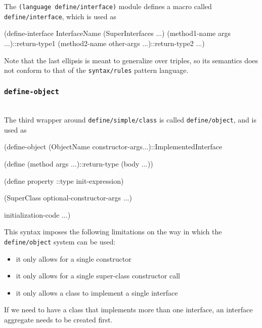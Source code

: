 \documentclass[acmsmall]{acmart}
\newenvironment{Snippet}{\Verbatim[samepage=true]}{\endVerbatim}
\begin{document}
The \texttt{(language define\-/interface)} module defines a macro called
\texttt{define\-/interface}, which is used as

\begin{Snippet}
  (define-interface InterfaceName (SuperInterfaces ...)
    (method1-name args ...)::return-type1
    (method2-name other-args ...)::return-type2
    ...)
\end{Snippet}

Note that the last ellipsis is meant to generalize over triples, so
its semantics does not conform to that of the \texttt{syntax\-/rules}
pattern language.

\subsubsection*{\texttt{\textbf{define-object}}} \ \\

The third wrapper around \texttt{define\-/simple\-/class} is called
\texttt{define\-/object}, and is used as

\begin{Snippet}
  (define-object (ObjectName constructor-args...)::ImplementedInterface
  
    (define (method args ...)::return-type (body ...))
  
    (define property ::type init-expression)
  
    (SuperClass optional-constructor-args ...)

    initialization-code ...)
\end{Snippet}

This syntax imposes the following limitations on the way in which
the \texttt{define\-/object} system can be used:
\begin{itemize}
\item it only allows for a single constructor
\item it only allows for a single super-class constructor call
\item it only allows a class to implement a single interface
\end{itemize}

If we need to have a class that implements more than one interface,
an interface aggregate needs to be created first.
\end{document}
